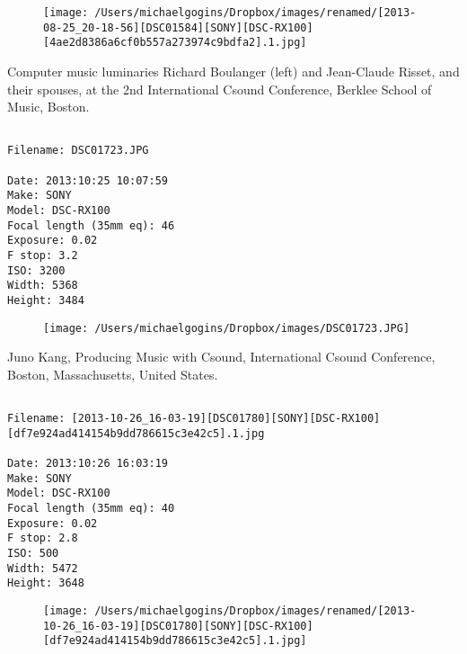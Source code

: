 \begin{figure}
\texttt{[image: /Users/michaelgogins/Dropbox/images/renamed/[2013-08-25\_20-18-56][DSC01584][SONY][DSC-RX100][4ae2d8386a6cf0b557a273974c9bdfa2].1.jpg]}
\end{figure}
    
\clearpage
\onecolumn
\noindent Computer music luminaries Richard Boulanger (left) and Jean-Claude Risset, and their spouses, at the 2nd International Csound Conference, Berklee School of Music, Boston.
\noindent
\begin{lstlisting}

Filename: DSC01723.JPG

Date: 2013:10:25 10:07:59
Make: SONY
Model: DSC-RX100
Focal length (35mm eq): 46
Exposure: 0.02
F stop: 3.2
ISO: 3200
Width: 5368
Height: 3484
\end{lstlisting}
\clearpage

\begin{figure}
\texttt{[image: /Users/michaelgogins/Dropbox/images/DSC01723.JPG]}
\end{figure}
    
\clearpage
\onecolumn
\noindent Juno Kang, Producing Music with Csound, International Csound Conference, Boston, Massachusetts, United States.
\noindent
\begin{lstlisting}

Filename: [2013-10-26_16-03-19][DSC01780][SONY][DSC-RX100][df7e924ad414154b9dd786615c3e42c5].1.jpg

Date: 2013:10:26 16:03:19
Make: SONY
Model: DSC-RX100
Focal length (35mm eq): 40
Exposure: 0.02
F stop: 2.8
ISO: 500
Width: 5472
Height: 3648
\end{lstlisting}
\clearpage

\begin{figure}
\texttt{[image: /Users/michaelgogins/Dropbox/images/renamed/[2013-10-26\_16-03-19][DSC01780][SONY][DSC-RX100][df7e924ad414154b9dd786615c3e42c5].1.jpg]}
\end{figure}
    
